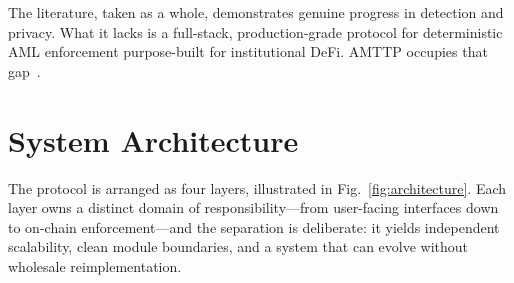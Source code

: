 \documentclass[journal]{IEEEtran}
\begin{document}
The literature, taken as a whole, demonstrates genuine progress in detection and privacy. What it lacks is a full-stack, production-grade protocol for deterministic AML enforcement purpose-built for institutional DeFi. AMTTP occupies that gap~\cite{sivaraju2024,ogunmola2025,campbell2026}.

\section{System Architecture}
\label{sec:arch}

The protocol is arranged as four layers, illustrated in Fig.~\ref{fig:architecture}. Each layer owns a distinct domain of responsibility---from user-facing interfaces down to on-chain enforcement---and the separation is deliberate: it yields independent scalability, clean module boundaries, and a system that can evolve without wholesale reimplementation.
\end{document}
